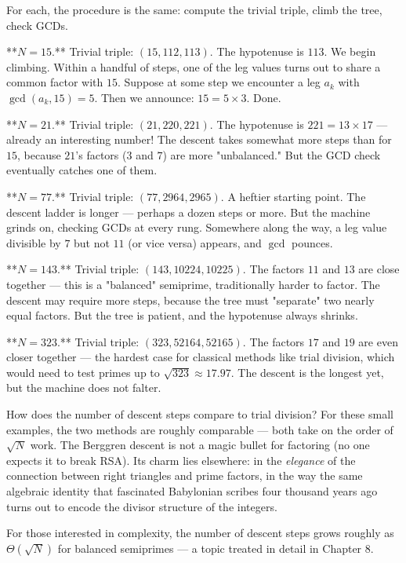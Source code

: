 For each, the procedure is the same: compute the trivial triple, climb the tree, check GCDs.

**$N = 15$.**
Trivial triple: $(15, 112, 113)$. The hypotenuse is $113$. We begin climbing. Within a handful of steps, one of the leg values turns out to share a common factor with $15$. Suppose at some step we encounter a leg $a_k$ with $\gcd(a_k, 15) = 5$. Then we announce: $15 = 5 \times 3$. Done.

**$N = 21$.**
Trivial triple: $(21, 220, 221)$. The hypotenuse is $221 = 13 \times 17$ --- already an interesting number! The descent takes somewhat more steps than for $15$, because $21$'s factors ($3$ and $7$) are more "unbalanced." But the GCD check eventually catches one of them.

**$N = 77$.**
Trivial triple: $(77, 2964, 2965)$. A heftier starting point. The descent ladder is longer --- perhaps a dozen steps or more. But the machine grinds on, checking GCDs at every rung. Somewhere along the way, a leg value divisible by $7$ but not $11$ (or vice versa) appears, and $\gcd$ pounces.

**$N = 143$.**
Trivial triple: $(143, 10224, 10225)$. The factors $11$ and $13$ are close together --- this is a "balanced" semiprime, traditionally harder to factor. The descent may require more steps, because the tree must "separate" two nearly equal factors. But the tree is patient, and the hypotenuse always shrinks.

**$N = 323$.**
Trivial triple: $(323, 52164, 52165)$. The factors $17$ and $19$ are even closer together --- the hardest case for classical methods like trial division, which would need to test primes up to $\sqrt{323} \approx 17.97$. The descent is the longest yet, but the machine does not falter.

How does the number of descent steps compare to trial division? For these small examples, the two methods are roughly comparable --- both take on the order of $\sqrt{N}$ work. The Berggren descent is not a magic bullet for factoring (no one expects it to break RSA). Its charm lies elsewhere: in the \textit{elegance} of the connection between right triangles and prime factors, in the way the same algebraic identity that fascinated Babylonian scribes four thousand years ago turns out to encode the divisor structure of the integers.

For those interested in complexity, the number of descent steps grows roughly as $\Theta(\sqrt{N})$ for balanced semiprimes --- a topic treated in detail in Chapter 8.

